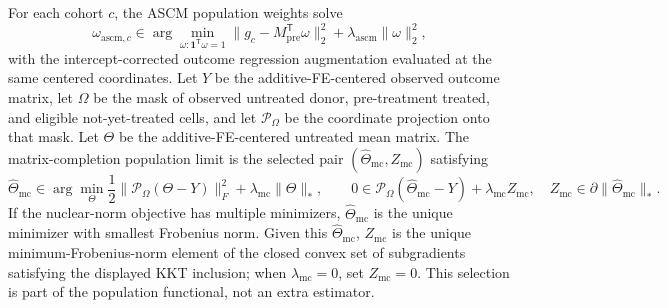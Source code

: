 \documentclass[11pt]{article}
\newcommand{\one}{\mathbf{1}}
\newcommand{\transpose}{\mathsf{T}}
\theoremstyle{definition}
\theoremstyle{plain}
\theoremstyle{remark}
\begin{document}
For each cohort \(c\), the ASCM population weights solve
\[
\omega_{\mathrm{ascm},c}
\in\arg\min_{\omega:\one^\transpose\omega=1}
\|g_c-M_{\mathrm{pre}}^\transpose\omega\|_2^2+\lambda_{\mathrm{ascm}}\|\omega\|_2^2,
\]
with the intercept-corrected outcome regression augmentation evaluated at the same centered coordinates.  Let \(Y\) be the additive-FE-centered observed outcome matrix, let \(\Omega\) be the mask of observed untreated donor, pre-treatment treated, and eligible not-yet-treated cells, and let \(\mathcal P_\Omega\) be the coordinate projection onto that mask.  Let \(\Theta\) be the additive-FE-centered untreated mean matrix.  The matrix-completion population limit is the selected pair \((\widehat \Theta_{\mathrm{mc}},Z_{\mathrm{mc}})\) satisfying
\[
\widehat \Theta_{\mathrm{mc}}
\in\arg\min_{\Theta}
\frac12\|\mathcal P_\Omega(\Theta-Y)\|_F^2+\lambda_{\mathrm{mc}}\|\Theta\|_*,
\qquad
0\in\mathcal P_\Omega(\widehat \Theta_{\mathrm{mc}}-Y)+\lambda_{\mathrm{mc}} Z_{\mathrm{mc}},
\quad
Z_{\mathrm{mc}}\in\partial\|\widehat \Theta_{\mathrm{mc}}\|_* .
\]
If the nuclear-norm objective has multiple minimizers, \(\widehat \Theta_{\mathrm{mc}}\) is the unique minimizer with smallest Frobenius norm.  Given this \(\widehat \Theta_{\mathrm{mc}}\), \(Z_{\mathrm{mc}}\) is the unique minimum-Frobenius-norm element of the closed convex set of subgradients satisfying the displayed KKT inclusion; when \(\lambda_{\mathrm{mc}}=0\), set \(Z_{\mathrm{mc}}=0\).  This selection is part of the population functional, not an extra estimator.
\end{document}
